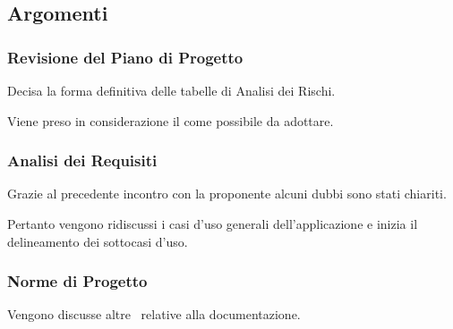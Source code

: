         \subsection{Argomenti}
            \subsubsection{Revisione del Piano di Progetto}
            Decisa la forma definitiva delle tabelle di Analisi dei Rischi.\par
            Viene preso in considerazione il  come possibile  da adottare.\par
            
            \subsubsection{Analisi dei Requisiti}
            Grazie al precedente incontro con la proponente {\II} alcuni dubbi sono stati chiariti.\par
            Pertanto vengono ridiscussi i casi d'uso generali dell'applicazione e inizia il delineamento dei sottocasi d'uso.
            
            \subsubsection{Norme di Progetto}
            Vengono discusse altre \NdP\ relative alla documentazione.


